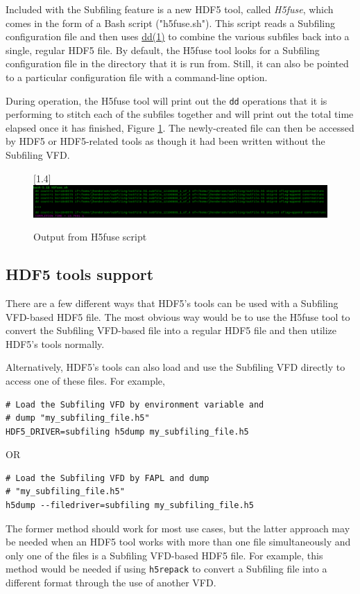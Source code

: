 \documentclass[../main.tex]{subfiles}
\begin{document}
Included with the Subfiling feature is a new HDF5 tool, called \textit{H5fuse}, which
comes in the form of a Bash script ("h5fuse.sh"). This script reads a Subfiling
configuration file and then uses \href{https://man7.org/linux/man-pages/man1/dd.1.html}{dd(1)}
to combine the various subfiles back into a single, regular HDF5 file. By default,
the H5fuse tool looks for a Subfiling configuration file in the directory that it
is run from. Still, it can also be pointed to a particular configuration file with a
command-line option.

During operation, the H5fuse tool will print out the \texttt{dd} operations that it
is performing to stitch each of the subfiles together and will print out the total
time elapsed once it has finished, Figure \ref{fig:h5fuse_output}. The newly-created file can then be accessed by
HDF5 or HDF5-related tools as though it had been written without the Subfiling
VFD.

\begin{figure}
\centering
\scalebox{1}[1.4]{\includegraphics[width=\textwidth]{images/H5fuse_edited.png}}
\caption{Output from H5fuse script}
\label{fig:h5fuse_output}
\end{figure}

\subsection{HDF5 tools support}

There are a few different ways that HDF5's tools can be used with a Subfiling VFD-based
HDF5 file. The most obvious way would be to use the H5fuse tool to convert the Subfiling
VFD-based file into a regular HDF5 file and then utilize HDF5's tools normally.

Alternatively, HDF5's tools can also load and use the Subfiling VFD directly to access one of these files. For example,

\begin{verbatim}
# Load the Subfiling VFD by environment variable and
# dump "my_subfiling_file.h5"
HDF5_DRIVER=subfiling h5dump my_subfiling_file.h5
\end{verbatim}

OR

\begin{verbatim}
# Load the Subfiling VFD by FAPL and dump 
# "my_subfiling_file.h5"
h5dump --filedriver=subfiling my_subfiling_file.h5
\end{verbatim}

The former method should work for most use cases, but the latter approach may be needed
when an HDF5 tool works with more than one file simultaneously and only one of the
files is a Subfiling VFD-based HDF5 file. For example, this method would be needed if
using \texttt{h5repack} to convert a Subfiling file into a different format through
the use of another VFD.
\end{document}
